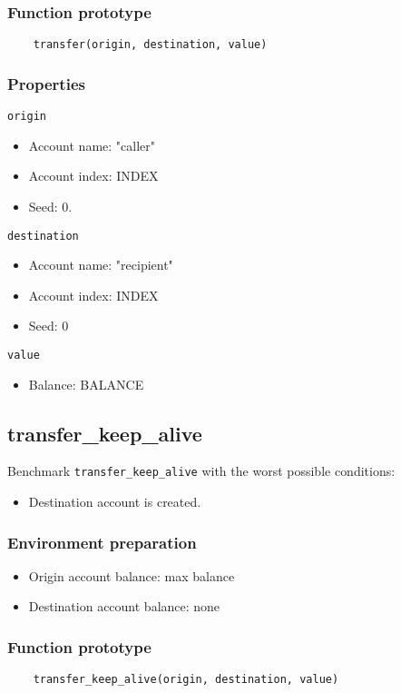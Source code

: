 \documentclass[11pt,a4paper]{article}
\begin{document}
\subsubsection*{Function prototype}
\begin{verbatim}
    transfer(origin, destination, value)
\end{verbatim}

\subsubsection*{Properties}
\verb|origin|
\begin{itemize}
\item Account name: "caller"
\item Account index: INDEX
\item Seed: 0.
\end{itemize}
\verb|destination|
\begin{itemize}
\item Account name: "recipient"
\item Account index: INDEX
\item Seed: 0
\end{itemize}
\verb|value|
\begin{itemize}
\item Balance: BALANCE
\end{itemize}

\subsection{transfer\_keep\_alive}

Benchmark \verb|transfer_keep_alive| with the worst possible conditions:
\begin{itemize}
\item Destination account is created.
\end{itemize}

\subsubsection*{Environment preparation}
\begin{itemize}
\item Origin account balance: max balance
\item Destination account balance: none
\end{itemize}

\subsubsection*{Function prototype}
\begin{verbatim}
    transfer_keep_alive(origin, destination, value)
\end{verbatim}
\end{document}

